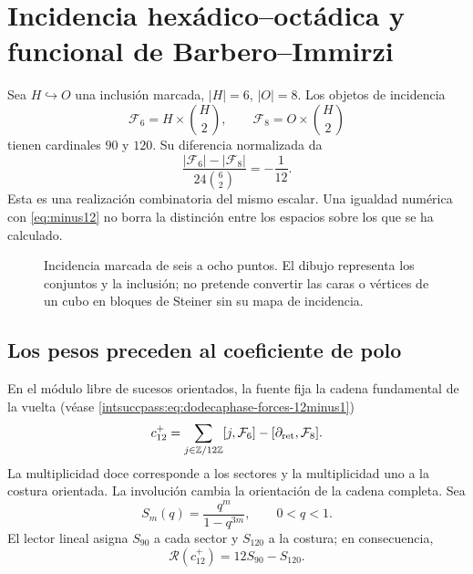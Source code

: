 \section{Incidencia hexádico--octádica y funcional de Barbero--Immirzi}
\label{sec:barbero}
Sea $H\hookrightarrow O$ una inclusión marcada, $|H|=6$, $|O|=8$.
Los objetos de incidencia
\[
\mathcal F_6=H\times\binom H2,\qquad
\mathcal F_8=O\times\binom H2
\]
tienen cardinales $90$ y $120$. Su diferencia normalizada da
\[
\frac{|\mathcal F_6|-|\mathcal F_8|}{24\binom62}=-\frac1{12}.
\]
Esta es una realización combinatoria del mismo escalar.
Una igualdad numérica con \eqref{eq:minus12} no borra
la distinción entre los espacios sobre los que se ha calculado.

\begin{figure}[htbp]
\centering
{}
\caption{Incidencia marcada de seis a ocho puntos. El dibujo representa
los conjuntos y la inclusión; no pretende convertir las caras o vértices
de un cubo en bloques de Steiner sin su mapa de incidencia.}
\end{figure}

\subsection{Los pesos preceden al coeficiente de polo}
En el módulo libre de sucesos orientados, la fuente fija la cadena
fundamental de la vuelta (véase \ref{intsuccpass:eq:dodecaphase-forces-12minus1})
\[
c_{12}^{+}=
\sum_{j\in\mathbb Z/12\mathbb Z}[j,\mathcal F_6]
-[\partial_{\rm ret},\mathcal F_8].
\]
La multiplicidad doce corresponde a los sectores y la multiplicidad uno
a la costura orientada. La involución cambia la orientación de la cadena
completa. Sea
\[
S_m(q)=\frac{q^m}{1-q^{3m}},\qquad 0<q<1.
\]
El lector lineal asigna $S_{90}$ a cada sector y $S_{120}$ a la costura;
en consecuencia,
\[
\mathscr R(c_{12}^{+})=12S_{90}-S_{120}.
\]

